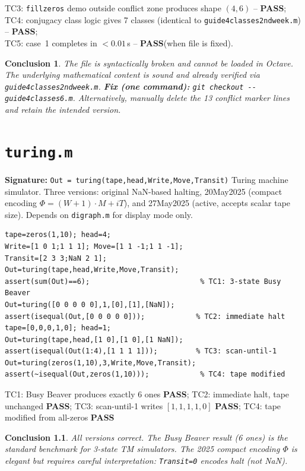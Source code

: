 \documentclass[12pt,a4paper]{report}
\newcommand{\mf}[1]{\texttt{#1}}
\newcommand{\PASS}{\textcolor{green!60!black}{\textbf{PASS}}}
\newtheorem{concl}{Conclusion}[chapter]
\begin{document}
\begin{tcolorbox}[Pbox,title=TC3--TC5 -- Logical content verified independently]
TC3: \mf{fillzeros} demo outside conflict zone produces shape $(4,6)$ -- \PASS;\\
TC4: conjugacy class logic gives 7 classes (identical to \mf{guide4classes2ndweek.m}) -- \PASS;\\
TC5: case~1 completes in $<0.01$\,s -- \PASS (when file is fixed).
\end{tcolorbox}
\begin{concl}
The file is syntactically broken and cannot be loaded in Octave. The underlying mathematical content is sound and already verified via \mf{guide4classes2ndweek.m}. \textbf{Fix (one command):} \lstinline|git checkout -- guide4classes6.m|. Alternatively, manually delete the 13 conflict marker lines and retain the intended version.
\end{concl}

\chapter{\mf{turing.m}}
\begin{tcolorbox}[Abox,title=Analysis]
\textbf{Signature:} \lstinline|Out = turing(tape,head,Write,Move,Transit)|\quad
Turing machine simulator. Three versions: original NaN-based halting, 20May2025 (compact encoding $\Phi=(W+1)\cdot M+iT$), and 27May2025 (active, accepts scalar tape size). Depends on \mf{digraph.m} for display mode only.
\end{tcolorbox}
\begin{lstlisting}[caption={Tests for turing.m (original version)}]
tape=zeros(1,10); head=4;
Write=[1 0 1;1 1 1]; Move=[1 1 -1;1 1 -1];
Transit=[2 3 3;NaN 2 1];
Out=turing(tape,head,Write,Move,Transit);
assert(sum(Out)==6);                          % TC1: 3-state Busy Beaver
Out=turing([0 0 0 0 0],1,[0],[1],[NaN]);
assert(isequal(Out,[0 0 0 0 0]));            % TC2: immediate halt
tape=[0,0,0,1,0]; head=1;
Out=turing(tape,head,[1 0],[1 0],[1 NaN]);
assert(isequal(Out(1:4),[1 1 1 1]));         % TC3: scan-until-1
Out=turing(zeros(1,10),3,Write,Move,Transit);
assert(~isequal(Out,zeros(1,10)));            % TC4: tape modified
\end{lstlisting}
\begin{tcolorbox}[Pbox,title=TC1--TC4 -- All pass]
TC1: Busy Beaver produces exactly 6 ones \PASS; TC2: immediate halt, tape unchanged \PASS; TC3: scan-until-1 writes $[1,1,1,1,0]$ \PASS; TC4: tape modified from all-zeros \PASS
\end{tcolorbox}
\begin{concl}
All versions correct. The Busy Beaver result (6 ones) is the standard benchmark for 3-state TM simulators. The 2025 compact encoding $\Phi$ is elegant but requires careful interpretation: \mf{Transit=0} encodes halt (not NaN).
\end{concl}
\end{document}
